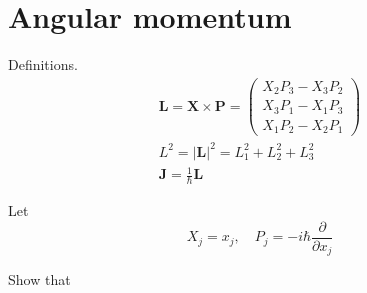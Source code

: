 

\section*{Angular momentum}

Definitions.
\begin{gather*}
\mathbf L=\mathbf X\times\mathbf P
=\begin{pmatrix}
X_2P_3-X_3P_2
\\
X_3P_1-X_1P_3
\\
X_1P_2-X_2P_1
\end{pmatrix}
\\[1ex]
L^2=|\mathbf L|^2=L_1^2+L_2^2+L_3^2
\\[1ex]
\mathbf J=\frac{1}{\hbar}\mathbf L
\end{gather*}

Let
\begin{equation*}
X_j=x_j,\quad P_j=-i\hbar\frac{\partial}{\partial x_j}
\end{equation*}

Show that

